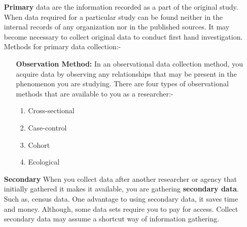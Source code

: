\documentclass[9 pt]{book}
\begin{document}
	\begin{itemize}
		\item[\textbf{Primary}] data are the information recorded as a part of the original study. When data required for a particular study can be found neither in the internal records of any organization nor in the published sources. It may become necessary to collect original data to conduct first hand investigation.\linebreak
		Methods for primary data collection:-
			\begin{enumerate}
				\item[\textbf{Observation Method:}] In an observational data collection method, you acquire data by observing any relationships that may be present in the phenomenon you are studying. There are four types of observational methods that are available to you as a researcher:-
					\begin{enumerate}
						\item Cross-sectional
						\item Case-control
						\item Cohort
						\item Ecological
					\end{enumerate}
			\end{enumerate}
		\item[\textbf{Secondary}] When you collect data after another researcher or agency that initially gathered it makes it available, you are gathering \textbf{secondary data}. Such as, census data. One advantage to using secondary data, it saves time and money. Although, some data sets require you to pay for access. Collect secondary data may assume a shortcut way of information gathering.
	\end{itemize}
	
\end{document}
